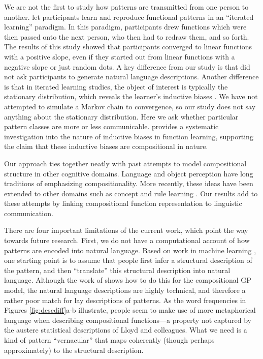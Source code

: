 \documentclass[a4paper,man, floatsintext, natbib]{apa6}
\begin{document}
We are not the first to study how patterns are transmitted from one person to another. \cite{kalish2007iterated} let participants learn and reproduce functional patterns in an ``iterated learning'' paradigm. In this paradigm, participants drew functions which were then passed onto the next person, who then had to redraw them, and so forth. The results of this study showed that participants converged to linear functions with a positive slope, even if they started out from linear functions with a negative slope or just random dots. A key difference from our study is that \citet{kalish2007iterated} did not ask participants to generate natural language descriptions. Another difference is that in iterated learning studies, the object of interest is typically the stationary distribution, which reveals the learner's inductive biases \citep{griffiths07, kirby2002emergence}. We have not attempted to simulate a Markov chain to convergence, so our study does not say anything about the stationary distribution. Here we ask whether particular pattern classes are more or less communicable. \citet{schulz2017compositional} provides a systematic investigation into the nature of inductive biases in function learning, supporting the claim that these inductive biases are compositional in nature.

Our approach ties together neatly with past attempts to model compositional structure in other cognitive domains. Language \citep{chomsky65} and object perception \citep{biederman87} have long traditions of emphasizing compositionality. More recently, these ideas have been extended to other domains such as concept \citep{feldman2000minimization} and rule learning \citep{goodman2008rational}. Our results add to these attempts by linking compositional function representation to linguistic communication.

There are four important limitations of the current work, which point the way towards future research. First, we do not have a computational account of how patterns are encoded into natural language. Based on work in machine learning \citep{lloyd2014automatic}, one starting point is to assume that people first infer a structural description of the pattern, and then ``translate'' this structural description into natural language. Although the work of \citet{lloyd2014automatic} shows how to do this for the compositional GP model, the natural language descriptions are highly technical, and therefore a rather poor match for lay descriptions of patterns. As the word frequencies in Figures \ref{fig:descdiff}a-b illustrate, people seem to make use of more metaphorical language when describing compositional functions---a property not captured by the austere statistical descriptions of Lloyd and colleagues. What we need is a kind of pattern ``vernacular'' that maps coherently (though perhaps approximately) to the structural description.
\end{document}
